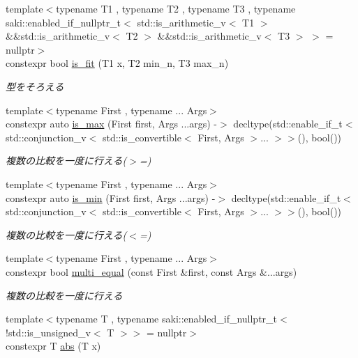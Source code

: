 \begin{DoxyCompactItemize}
{\footnotesize template$<$typename T1 , typename T2 , typename T3 , typename saki\+::enabled\+\_\+if\+\_\+nullptr\+\_\+t$<$ std\+::is\+\_\+arithmetic\+\_\+v$<$ T1 $>$ \&\&std\+::is\+\_\+arithmetic\+\_\+v$<$ T2 $>$ \&\&std\+::is\+\_\+arithmetic\+\_\+v$<$ T3 $>$ $>$  = nullptr$>$ }\\constexpr bool \mbox{\hyperlink{namespacesaki_aa8702191f3514794558097f7928dd57d}{is\+\_\+fit}} (T1 x, T2 min\+\_\+n, T3 max\+\_\+n)
\begin{DoxyCompactList}\small\item\em 型をそろえる \end{DoxyCompactList}\item 
{\footnotesize template$<$typename First , typename ... Args$>$ }\\constexpr auto \mbox{\hyperlink{namespacesaki_ae6b9ce1ba404eba8dd9035f99e8666c4}{is\+\_\+max}} (First first, Args ...args) -\/$>$ decltype(std\+::enable\+\_\+if\+\_\+t$<$ std\+::conjunction\+\_\+v$<$ std\+::is\+\_\+convertible$<$ First, Args $>$... $>$$>$(), bool())
\begin{DoxyCompactList}\small\item\em 複数の比較を一度に行える($>$=) \end{DoxyCompactList}\item 
{\footnotesize template$<$typename First , typename ... Args$>$ }\\constexpr auto \mbox{\hyperlink{namespacesaki_a76f6dc2cbe6bb83e0235b9635eb33ad2}{is\+\_\+min}} (First first, Args ...args) -\/$>$ decltype(std\+::enable\+\_\+if\+\_\+t$<$ std\+::conjunction\+\_\+v$<$ std\+::is\+\_\+convertible$<$ First, Args $>$... $>$$>$(), bool())
\begin{DoxyCompactList}\small\item\em 複数の比較を一度に行える($<$=) \end{DoxyCompactList}\item 
{\footnotesize template$<$typename First , typename ... Args$>$ }\\constexpr bool \mbox{\hyperlink{namespacesaki_a08e1e3f9c27a1f59e6f096bcd22c8749}{multi\+\_\+equal}} (const First \&first, const Args \&...args)
\begin{DoxyCompactList}\small\item\em 複数の比較を一度に行える \end{DoxyCompactList}\item 
{\footnotesize template$<$typename T , typename saki\+::enabled\+\_\+if\+\_\+nullptr\+\_\+t$<$!std\+::is\+\_\+unsigned\+\_\+v$<$ T $>$$>$  = nullptr$>$ }\\constexpr T \mbox{\hyperlink{namespacesaki_a37cd607ad87b208aa6105b5d8287dc9e}{abs}} (T x)

\end{DoxyCompactItemize}
